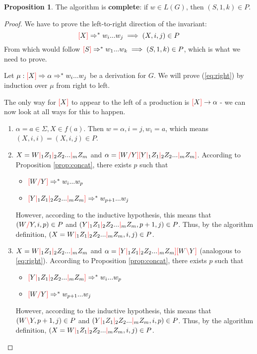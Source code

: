 \documentclass[12pt]{extarticle}
\theoremstyle{definition} \newtheorem{defn}{Definition}
\theoremstyle{definition} \newtheorem{prop}{Proposition}
\newcommand{\lc}{\textcolor{red}{\backslash}}
\newcommand{\rc}{\textcolor{red}{/}}
\newcommand{\mc}{\textcolor{red}{|}}
\newcommand{\lb}{\textcolor{red}{[}}
\newcommand{\rb}{\textcolor{red}{]}}
\begin{document}
\begin{prop}
    The algorithm is \textbf{complete}: if $w \in L(G)$, then $(S, 1, k) \in P$.
\end{prop}
\begin{proof}
    We have to prove the left-to-right direction of the invariant:
    \begin{equation}\label{eq:right}
        \lb X \rb \Rightarrow^* w_i ... w_j \implies (X, i, j) \in P
    \end{equation}
    From which would follow $ \lb S \rb \Rightarrow^* w_1 ... w_k \implies (S, 1, k) \in P$,
    which is what we need to prove.

    Let $\mu: \lb X \rb \Rightarrow \alpha \Rightarrow^* w_i ... w_j$
    be a derivation for $G$. We will prove (\ref{eq:right}) by induction over
    $\mu$ from right to left.

    The only way for $\lb X \rb$ to appear to the left
    of a production is $\lb X \rb \rightarrow \alpha$ - we can now look at
    all ways for this to happen.
    \begin{enumerate}
        \item $\alpha = a \in \Sigma, X \in f(a)$. Then $w = \alpha, i = j, w_i = a$,
            which means $(X, i, i) = (X, i, j) \in P$.
        \item $X = W \mc_1 Z_1 \mc_2 Z_2 ... \mc_m Z_m$ and
            $\alpha = \lb W \rc Y \rb \lb Y \mc_1 Z_1 \mc_2 Z_2 ... \mc_m Z_m \rb$.
            According to Proposition \ref{prop:concat}, there exists $p$ such that
            \begin{itemize}
                \item $\lb W \rc Y \rb \Rightarrow^* w_i ... w_p$
                \item $\lb Y \mc_1 Z_1 \mc_2 Z_2 ... \mc_m Z_m \rb \Rightarrow^* w_{p+1} ... w_j$
            \end{itemize}
            However, according to the inductive hypothesis, this means that
            $(W \rc Y, i, p) \in P$ and
            $(Y \mc_1 Z_1 \mc_2 Z_2 ... \mc_m Z_m, p + 1, j) \in P$. Thus,
            by the algorithm definition,
            $(X = W \mc_1 Z_1 \mc_2 Z_2 ... \mc_m Z_m, i, j) \in P$.
        \item $X = W \mc_1 Z_1 \mc_2 Z_2 ... \mc_m Z_m$ and
            $\alpha = \lb Y \mc_1 Z_1 \mc_2 Z_2 ... \mc_m Z_m \rb \lb W \lc Y \rb$
            (analogous to \ref{eq:right}).
            According to Proposition \ref{prop:concat}, there exists $p$ such that
            \begin{itemize}
                \item $\lb Y \mc_1 Z_1 \mc_2 Z_2 ... \mc_m Z_m \rb \Rightarrow^* w_i ... w_p$
                \item $\lb W \rc Y \rb \Rightarrow^* w_{p + 1} ... w_j$
            \end{itemize}
            However, according to the inductive hypothesis, this means that
            $(W \lc Y, p + 1, j) \in P$ and
            $(Y \mc_1 Z_1 \mc_2 Z_2 ... \mc_m Z_m, i, p) \in P$. Thus,
            by the algorithm definition,
            $(X = W \mc_1 Z_1 \mc_2 Z_2 ... \mc_m Z_m, i, j) \in P$.
    \end{enumerate}


\end{proof}
\end{document}
